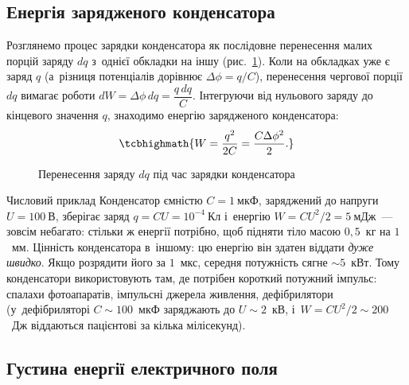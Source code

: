 \subsection*{Енергія зарядженого конденсатора}



Розглянемо процес зарядки конденсатора як послідовне перенесення малих порцій заряду $dq$
з~однієї обкладки на іншу (рис.~\ref{pic:CapacitorDq}). Коли на обкладках уже є заряд $q$
(а~різниця потенціалів дорівнює $\Delta\phi = q/C$), перенесення чергової порції $dq$
вимагає роботи $dW = \Delta\phi\, dq = \dfrac{q\,dq}{C}$. Інтегруючи від нульового заряду
до кінцевого значення $q$, знаходимо енергію зарядженого конденсатора:
\begin{equation}\label{eq:CapacitorEnergy}
	\tcbhighmath{
		W = \frac{q^2}{2C} = \frac{C\Delta\phi^2}{2}.
	}
\end{equation}

\begin{figure}\centering
	\caption{Перенесення заряду $dq$ під час зарядки конденсатора\label{pic:CapacitorDq}}
\end{figure}

\begin{Example}{Числовий приклад} Конденсатор ємністю $C = 1\ \text{мкФ}$, заряджений до напруги $U = 100\ \text{В}$, зберігає заряд
	$q = CU = 10^{-4}\ \text{Кл}$ і~енергію $W = CU^2/2 = 5\ \text{мДж}$~--- зовсім небагато:
	стільки ж енергії потрібно, щоб підняти тіло масою $0{,}5$~кг на $1$~мм. Цінність
	конденсатора в~іншому: цю енергію він здатен віддати \emph{дуже швидко}. Якщо
	розрядити його за $1$~мкс, середня потужність сягне $\sim5$~кВт. Тому конденсатори
	використовують там, де потрібен короткий потужний імпульс: спалахи фотоапаратів,
	імпульсні джерела живлення, дефібрилятори (у~дефібриляторі $C \sim 100$~мкФ заряджають
	до $U \sim 2$~кВ, і~$W = CU^2/2 \sim 200$~Дж віддаються пацієнтові за кілька мілісекунд).
\end{Example}



\subsection*{Густина енергії електричного поля}\label{sec:FieldEnergyDensity}



